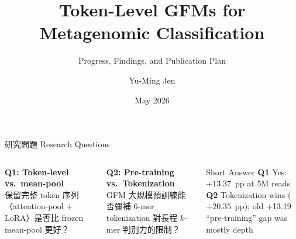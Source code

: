 \documentclass[aspectratio=169,12pt]{beamer}
\title{Token-Level GFMs for Metagenomic Classification}
\subtitle{Progress, Findings, and Publication Plan}
\author{Yu-Ming Jen}
\institute{NTU CSIE}
\date{May 2026}
\begin{document}
\maketitle

\begin{frame}{研究問題 Research Questions}
\begin{columns}
\textbf{Q1: Token-level vs.\ mean-pool}\\[4pt]
保留完整 token 序列（attention-pool + LoRA）是否比 frozen mean-pool 更好？

\vspace{1em}
\textbf{Q2: Pre-training vs.\ Tokenization}\\[4pt]
GFM 大規模預訓練能否彌補 6-mer tokenization 對長程 $k$-mer 判別力的限制？

\begin{block}{Short Answer}
\textbf{Q1} Yes: $+13.37$~pp at 5M reads\\[2pt]
\textbf{Q2} Tokenization wins ($+20.35$~pp); old +13.19 ``pre-training'' gap was mostly depth
\end{block}
\end{columns}
\end{frame}
\end{document}

